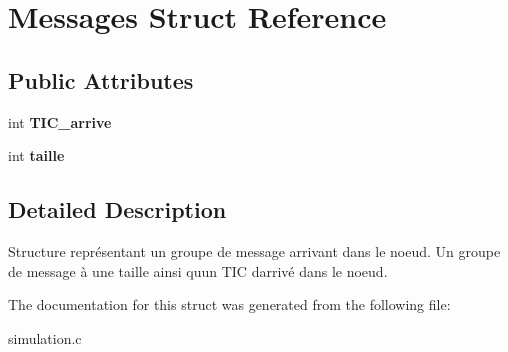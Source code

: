\hypertarget{structMessages}{}\section{Messages Struct Reference}
\label{structMessages}
\subsection*{Public Attributes}
\begin{DoxyCompactItemize}
\item 
int {\bfseries T\+I\+C\+\_\+arrive}\hypertarget{structMessages_a9a9d3325111fa2d5c81a39c70d8ff763}{}\label{structMessages_a9a9d3325111fa2d5c81a39c70d8ff763}

\item 
int {\bfseries taille}\hypertarget{structMessages_ade54b5136b839d45e2c25a978a824939}{}\label{structMessages_ade54b5136b839d45e2c25a978a824939}

\end{DoxyCompactItemize}


\subsection{Detailed Description}
Structure représentant un groupe de message arrivant dans le noeud. Un groupe de message à une taille ainsi qu\textquotesingle{}un T\+IC d\textquotesingle{}arrivé dans le noeud. 

The documentation for this struct was generated from the following file\+:\begin{DoxyCompactItemize}
\item 
simulation.\+c\end{DoxyCompactItemize}

